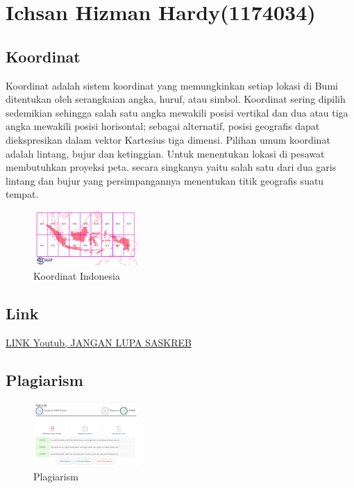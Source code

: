 \section{Ichsan Hizman Hardy(1174034)}

\subsection{Koordinat}
\par
Koordinat adalah sistem koordinat yang memungkinkan setiap lokasi di Bumi ditentukan oleh serangkaian angka, huruf, atau simbol. Koordinat sering dipilih sedemikian sehingga salah satu angka mewakili posisi vertikal dan dua atau tiga angka mewakili posisi horisontal; sebagai alternatif, posisi geografis dapat diekspresikan dalam vektor Kartesius tiga dimensi. Pilihan umum koordinat adalah lintang, bujur dan ketinggian. Untuk menentukan lokasi di pesawat membutuhkan proyeksi peta. secara singkanya yaitu salah satu dari dua garis lintang dan bujur yang persimpangannya menentukan titik geografis suatu tempat.


\begin{figure}[H]
	\includegraphics[width=4cm]{figures/1174034/koordinat.png}
	\centering
	\caption{Koordinat Indonesia}
\end{figure}

\subsection{Link}
\href{https://youtu.be/SxklV9IEFhc}{LINK Youtub, JANGAN LUPA SASKREB}
\subsection{Plagiarism}
\begin{figure}[H]
	\includegraphics[width=4cm]{figures/1174034/plagiarism.png}
	\centering
	\caption{Plagiarism}
\end{figure}